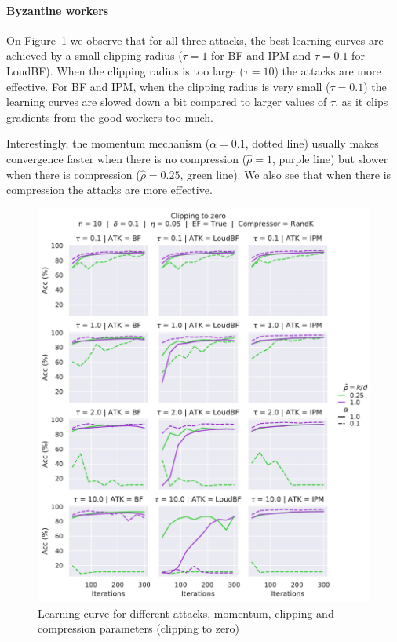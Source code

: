 \documentclass{article}
\begin{document}
\paragraph{Byzantine workers}


On Figure~\ref{fig:clipping-zero} we observe that for all three attacks, the best learning curves are achieved by a small clipping radius ($\tau = 1$ for BF and IPM and $\tau=0.1$ for LoudBF).  When the clipping radius is too large ($\tau=10$) the attacks are more effective. For BF and IPM, when the clipping radius is very small ($\tau=0.1$) the learning curves are slowed down a bit compared to larger values of $\tau$, as it clips gradients from the good workers too much.

Interestingly, the momentum mechanism ($\alpha=0.1$, dotted line) usually makes convergence faster when there is no compression ($\hat\rho=1$, purple line) but slower when there is compression ($\hat\rho=0.25$, green line). We also see that when there is compression the attacks are more effective.

\begin{figure}[h]
\centering
\includegraphics[scale=0.63]{figures/EXP_Clipping_Zero}
\caption{Learning curve for different attacks, momentum, clipping and compression parameters (clipping to zero)}\label{fig:clipping-zero}
\end{figure}
\end{document}
